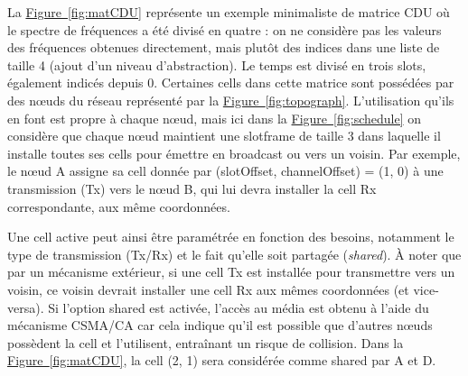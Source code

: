 \documentclass[]{report}
\newcommand{\wordlink}[2]{\hyperref[#2]{#1~\ref{#2}}}
\begin{document}
\newpage

\par La \wordlink{Figure}{fig:matCDU} représente un exemple minimaliste de matrice CDU où le spectre de fréquences a été divisé en quatre : on ne considère pas les valeurs des fréquences obtenues directement, mais plutôt des indices dans une liste de taille 4 (ajout d'un niveau d'abstraction). Le temps est divisé en trois slots, également indicés depuis 0. Certaines cells dans cette matrice sont possédées par des nœuds du réseau représenté par la \wordlink{Figure}{fig:topograph}. L'utilisation qu'ils en font est propre à chaque nœud, mais ici dans la \wordlink{Figure}{fig:schedule} on considère que chaque nœud maintient une slotframe de taille 3 dans laquelle il installe toutes ses cells pour émettre en broadcast ou vers un voisin. Par exemple, le nœud A assigne sa cell donnée par (slotOffset, channelOffset) = (1, 0) à une transmission (Tx) vers le nœud B, qui lui devra installer la cell Rx correspondante, aux même coordonnées.\\

\par Une cell active peut ainsi être paramétrée en fonction des besoins, notamment le type de transmission (Tx/Rx) et le fait qu'elle soit partagée (\textit{shared}). À noter que par un mécanisme extérieur, si une cell Tx est installée pour transmettre vers un voisin, ce voisin devrait installer une cell Rx aux mêmes coordonnées (et vice-versa). Si l'option shared est activée, l'accès au média est obtenu à l'aide du mécanisme CSMA/CA car cela indique qu'il est possible que d'autres nœuds possèdent la cell et l'utilisent, entraînant un risque de collision. Dans la \wordlink{Figure}{fig:matCDU}, la cell (2, 1) sera considérée comme shared par A et D.\\
\end{document}
